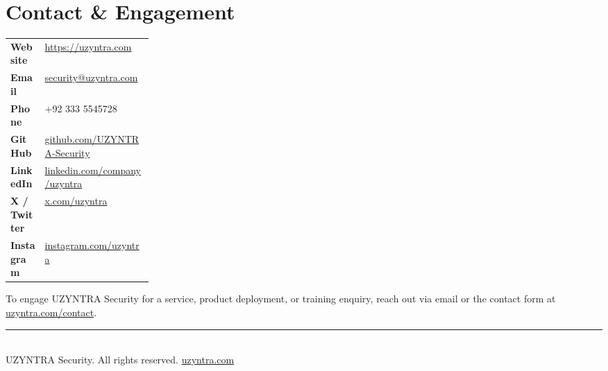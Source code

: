 \documentclass[11pt,a4paper]{article}
\begin{document}
\section{Contact \& Engagement}
\begin{infobox}
\begin{tabularx}{\linewidth}{@{}>{\bfseries}p{0.24\linewidth}X@{}}
Website & \href{https://uzyntra.com}{https://uzyntra.com} \\
Email & \href{mailto:security@uzyntra.com}{security@uzyntra.com} \\
Phone & +92 333 5545728 \\
GitHub & \href{https://github.com/UZYNTRA-Security}{github.com/UZYNTRA-Security} \\
LinkedIn & \href{https://linkedin.com/company/uzyntra}{linkedin.com/company/uzyntra} \\
X / Twitter & \href{https://x.com/uzyntra}{x.com/uzyntra} \\
Instagram & \href{https://instagram.com/uzyntra}{instagram.com/uzyntra} \\
\end{tabularx}
\end{infobox}

To engage UZYNTRA Security for a service, product deployment, or training enquiry, reach out via email or the contact form at \href{https://uzyntra.com/contact}{uzyntra.com/contact}.

\vfill
\begin{center}
\textcolor{uzline}{\rule{0.48\linewidth}{0.5pt}}\\[7pt]
{\small\sffamily\color{uzgray}\textcopyright{} UZYNTRA Security. All rights reserved. \href{https://uzyntra.com}{uzyntra.com}}
\end{center}
\end{document}
